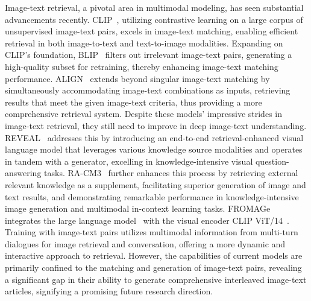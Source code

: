 \documentclass[10pt,twocolumn,letterpaper]{article}
\begin{document}
Image-text retrieval, a pivotal area in multimodal modeling, has seen substantial advancements recently. CLIP~\cite{radford2021learning}, utilizing contrastive learning on a large corpus of unsupervised image-text pairs, excels in image-text matching, enabling efficient retrieval in both image-to-text and text-to-image modalities. Expanding on CLIP's foundation, BLIP~\cite{li2022blip} filters out irrelevant image-text pairs, generating a high-quality subset for retraining, thereby enhancing image-text matching performance. ALIGN~\cite{jia2021scaling} extends beyond singular image-text matching by simultaneously accommodating image-text combinations as inputs, retrieving results that meet the given image-text criteria, thus providing a more comprehensive retrieval system. Despite these models' impressive strides in image-text retrieval, they still need to improve in deep image-text understanding. REVEAL~\cite{hu2023reveal} addresses this by introducing an end-to-end retrieval-enhanced visual language model that leverages various knowledge source modalities and operates in tandem with a generator, excelling in knowledge-intensive visual question-answering tasks. RA-CM3~\cite{yasunaga2023retrieval} further enhances this process by retrieving external relevant knowledge as a supplement, facilitating superior generation of image and text results, and demonstrating remarkable performance in knowledge-intensive image generation and multimodal in-context learning tasks. FROMAGe~\cite{koh2023grounding} integrates the large language model~\cite{zhang2205opt} with the visual encoder CLIP ViT/14~\cite{radford2021learning}. Training with image-text pairs utilizes multimodal information from multi-turn dialogues for image retrieval and conversation, offering a more dynamic and interactive approach to retrieval. However, the capabilities of current models are primarily confined to the matching and generation of image-text pairs, revealing a significant gap in their ability to generate comprehensive interleaved image-text articles, signifying a promising future research direction. 
\end{document}
